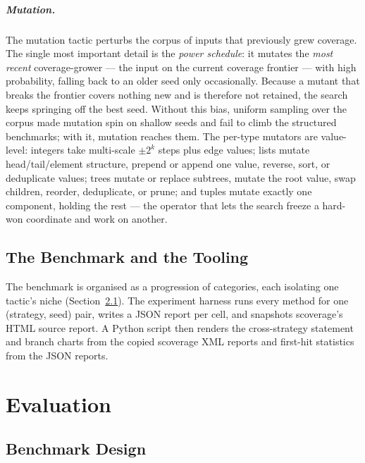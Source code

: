 \documentclass[11pt,a4paper]{report}
\begin{document}
\paragraph{Mutation.} The mutation tactic perturbs the corpus of inputs that previously grew coverage. The
single most important detail is the \emph{power schedule}: it mutates the \emph{most recent} coverage-grower —
the input on the current coverage frontier — with high probability, falling back to an older seed only
occasionally. Because a mutant that breaks the frontier covers nothing new and is therefore not retained,
the search keeps springing off the best seed. Without this bias, uniform sampling over the corpus made
mutation spin on shallow seeds and fail to climb the structured benchmarks; with it, mutation reaches them.
The per-type mutators are value-level: integers take multi-scale $\pm 2^k$ steps plus edge values; lists
mutate head/tail/element structure, prepend or append one value, reverse, sort, or deduplicate values; trees
mutate or replace subtrees, mutate the root value, swap children, reorder, deduplicate, or prune; and tuples
mutate exactly one component, holding the rest — the operator that lets the search freeze a hard-won coordinate
and work on another.

\section{The Benchmark and the Tooling}
\label{sec:bench-impl}

The benchmark is organised as a progression of categories, each isolating one tactic's niche
(Section~\ref{sec:bench-design}). The experiment harness runs every method for one (strategy, seed) pair,
writes a JSON report per cell, and snapshots scoverage's HTML source report. A Python script then renders the
cross-strategy statement and branch charts from the copied scoverage XML reports and first-hit statistics
from the JSON reports.

\chapter{Evaluation}
\label{ch:eval}

\section{Benchmark Design}
\label{sec:bench-design}
\end{document}
